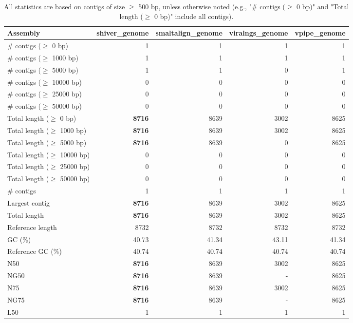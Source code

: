 \documentclass[12pt,a4paper]{article}
\begin{document}
\begin{table}[ht]
\begin{center}
\caption{All statistics are based on contigs of size $\geq$ 500 bp, unless otherwise noted (e.g., "\# contigs ($\geq$ 0 bp)" and "Total length ($\geq$ 0 bp)" include all contigs).}
\begin{tabular}{|l*{4}{|r}|}
\hline
Assembly & shiver\_genome & smaltalign\_genome & viralngs\_genome & vpipe\_genome \\ \hline
\# contigs ($\geq$ 0 bp) & 1 & 1 & 1 & 1 \\ \hline
\# contigs ($\geq$ 1000 bp) & 1 & 1 & 1 & 1 \\ \hline
\# contigs ($\geq$ 5000 bp) & 1 & 1 & 0 & 1 \\ \hline
\# contigs ($\geq$ 10000 bp) & 0 & 0 & 0 & 0 \\ \hline
\# contigs ($\geq$ 25000 bp) & 0 & 0 & 0 & 0 \\ \hline
\# contigs ($\geq$ 50000 bp) & 0 & 0 & 0 & 0 \\ \hline
Total length ($\geq$ 0 bp) & {\bf 8716} & 8639 & 3002 & 8625 \\ \hline
Total length ($\geq$ 1000 bp) & {\bf 8716} & 8639 & 3002 & 8625 \\ \hline
Total length ($\geq$ 5000 bp) & {\bf 8716} & 8639 & 0 & 8625 \\ \hline
Total length ($\geq$ 10000 bp) & 0 & 0 & 0 & 0 \\ \hline
Total length ($\geq$ 25000 bp) & 0 & 0 & 0 & 0 \\ \hline
Total length ($\geq$ 50000 bp) & 0 & 0 & 0 & 0 \\ \hline
\# contigs & 1 & 1 & 1 & 1 \\ \hline
Largest contig & {\bf 8716} & 8639 & 3002 & 8625 \\ \hline
Total length & {\bf 8716} & 8639 & 3002 & 8625 \\ \hline
Reference length & 8732 & 8732 & 8732 & 8732 \\ \hline
GC (\%) & 40.73 & 41.34 & 43.11 & 41.34 \\ \hline
Reference GC (\%) & 40.74 & 40.74 & 40.74 & 40.74 \\ \hline
N50 & {\bf 8716} & 8639 & 3002 & 8625 \\ \hline
NG50 & {\bf 8716} & 8639 & - & 8625 \\ \hline
N75 & {\bf 8716} & 8639 & 3002 & 8625 \\ \hline
NG75 & {\bf 8716} & 8639 & - & 8625 \\ \hline
L50 & 1 & 1 & 1 & 1 \\ \hline

\end{tabular}
\end{center}
\end{table}
\end{document}
